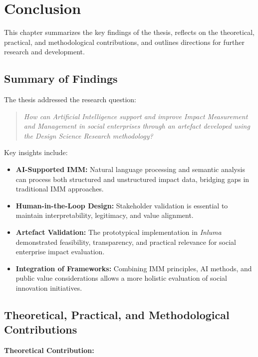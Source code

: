 \chapter{Conclusion}\label{ch:conclusion}

This chapter summarizes the key findings of the thesis, reflects on the theoretical, practical, and methodological contributions, and outlines directions for further research and development.

\section{Summary of Findings}\label{sec:summary-findings}

The thesis addressed the research question:

\begin{quote}
\textit{How can Artificial Intelligence support and improve Impact Measurement and Management in social enterprises through an artefact developed using the Design Science Research methodology?}
\end{quote}

Key insights include:

\begin{itemize}
    \item \textbf{AI-Supported IMM:} Natural language processing and semantic analysis can process both structured and unstructured impact data, bridging gaps in traditional IMM approaches.
    \item \textbf{Human-in-the-Loop Design:} Stakeholder validation is essential to maintain interpretability, legitimacy, and value alignment.
    \item \textbf{Artefact Validation:} The prototypical implementation in \textit{Inluma} demonstrated feasibility, transparency, and practical relevance for social enterprise impact evaluation.
    \item \textbf{Integration of Frameworks:} Combining IMM principles, AI methods, and public value considerations allows a more holistic evaluation of social innovation initiatives.
\end{itemize}

\section{Theoretical, Practical, and Methodological Contributions}\label{sec:contributions}

\textbf{Theoretical Contribution:}

